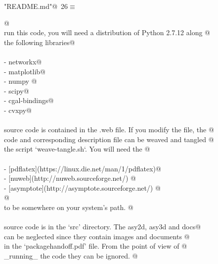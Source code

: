 \documentclass[10pt, english, oneside]{report}
\begin{document}
\begin{appendices}
\begin{flushleft} \small\label{scrap30}\raggedright\small
{} \verb@"README.md"@\nobreak\ {\footnotesize {26}}$\equiv$
\vspace{-1ex}
\begin{list}{}{} \item
\mbox{}\verb@    @\\
\mbox{}\verb@To run this code, you will need a distribution of Python 2.7.12 along @\\
\mbox{}\verb@with the following libraries@\\
\mbox{}\verb@@\\
\mbox{}\verb@- networkx@\\
\mbox{}\verb@- matplotlib@\\
\mbox{}\verb@- numpy @\\
\mbox{}\verb@- scipy@\\
\mbox{}\verb@- cgal-bindings@\\
\mbox{}\verb@- cvxpy@\\
\mbox{}\verb@@\\
\mbox{}\verb@All source code is contained in the .web file. If you modify the file, the @\\
\mbox{}\verb@resulting code and corresponding description file can be weaved and tangled @\\
\mbox{}\verb@with the script `weave-tangle.sh`. You will need the @\\
\mbox{}\verb@@\\
\mbox{}\verb@- [pdflatex](https://linux.die.net/man/1/pdflatex)@\\
\mbox{}\verb@- [nuweb](http://nuweb.sourceforge.net/) @\\
\mbox{}\verb@- [asymptote](http://asymptote.sourceforge.net/) @\\
\mbox{}\verb@  @\\
\mbox{}\verb@executables to be somewhere on your system's path. @\\
\mbox{}\verb@@\\
\mbox{}\verb@All source code is in the `src' directory. The asy2d, asy3d and docs@\\
\mbox{}\verb@folders can be neglected since they contain images and documents @\\
\mbox{}\verb@referenced in the `packagehandoff.pdf' file. From the point of view of @\\
\mbox{}\verb@_running_ the code they can be ignored. @\\
\mbox{}\verb@@\\
\mbox{}\verb@@\\
\mbox{}\verb@@\\
\mbox{}\verb@@{\NWsep}
\end{list}
\vspace{-1.5ex}
\footnotesize
\begin{list}{}{\setlength{\itemsep}{-\parsep}\setlength{\itemindent}{-\leftmargin}}


\end{list}
\end{flushleft}
\end{appendices}
\end{document}
